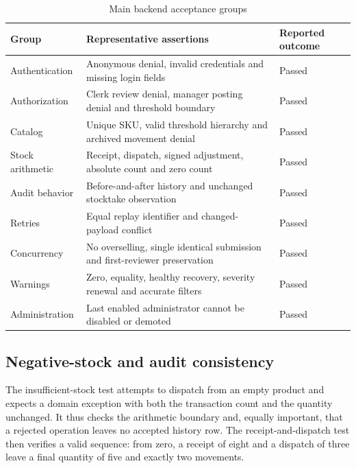 \begin{table}[htbp]\centering\small{}\setlength{\tabcolsep}{3pt}\renewcommand{\arraystretch}{1.25}
\caption{Main backend acceptance groups}\label{tab:backend-groups}
\begin{tabular}{>{\raggedright\arraybackslash}p{}>{\raggedright\arraybackslash}p{}>{\raggedright\arraybackslash}p{}}
\toprule
\textbf{Group} & \textbf{Representative assertions} & \textbf{Reported outcome} \\
\midrule
\leavevmode{}Authentication & \leavevmode{}Anonymous denial, invalid credentials and missing login fields & \leavevmode{}Passed \\
\leavevmode{}Authorization & \leavevmode{}Clerk review denial, manager posting denial and threshold boundary & \leavevmode{}Passed \\
\leavevmode{}Catalog & \leavevmode{}Unique SKU, valid threshold hierarchy and archived movement denial & \leavevmode{}Passed \\
\leavevmode{}Stock arithmetic & \leavevmode{}Receipt, dispatch, signed adjustment, absolute count and zero count & \leavevmode{}Passed \\
\leavevmode{}Audit behavior & \leavevmode{}Before-and-after history and unchanged stocktake observation & \leavevmode{}Passed \\
\leavevmode{}Retries & \leavevmode{}Equal replay identifier and changed-payload conflict & \leavevmode{}Passed \\
\leavevmode{}Concurrency & \leavevmode{}No overselling, single identical submission and first-reviewer preservation & \leavevmode{}Passed \\
\leavevmode{}Warnings & \leavevmode{}Zero, equality, healthy recovery, severity renewal and accurate filters & \leavevmode{}Passed \\
\leavevmode{}Administration & \leavevmode{}Last enabled administrator cannot be disabled or demoted & \leavevmode{}Passed \\
\bottomrule\end{tabular}\end{table}

\subsection{Negative-stock and audit consistency}

The insufficient-stock test attempts to dispatch from an empty product and expects a domain exception with both the transaction count and the quantity unchanged. It thus checks the arithmetic boundary and, equally important, that a rejected operation leaves no accepted history row. The receipt-and-dispatch test then verifies a valid sequence: from zero, a receipt of eight and a dispatch of three leave a final quantity of five and exactly two movements.


